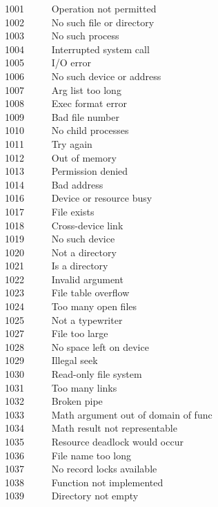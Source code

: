 1001 \ \ \ \ \ Operation not permitted\\
1002 \ \ \ \ \ No such file or directory\\
1003 \ \ \ \ \ No such process\\
1004 \ \ \ \ \ Interrupted system call\\
1005 \ \ \ \ \ I/O error\\
1006 \ \ \ \ \ No such device or address\\
1007 \ \ \ \ \ Arg list too long\\
1008 \ \ \ \ \ Exec format error\\
1009 \ \ \ \ \ Bad file number\\
1010 \ \ \ \ \ No child processes\\
1011 \ \ \ \ \ Try again\\
1012 \ \ \ \ \ Out of memory\\
1013 \ \ \ \ \ Permission denied\\
1014 \ \ \ \ \ Bad address\\
1016 \ \ \ \ \ Device or resource busy\\
1017 \ \ \ \ \ File exists\\
1018 \ \ \ \ \ Cross-device link\\
1019 \ \ \ \ \ No such device\\
1020 \ \ \ \ \ Not a directory\\
1021 \ \ \ \ \ Is a directory\\
1022 \ \ \ \ \ Invalid argument\\
1023 \ \ \ \ \ File table overflow\\
1024 \ \ \ \ \ Too many open files\\
1025 \ \ \ \ \ Not a typewriter\\
1027 \ \ \ \ \ File too large\\
1028 \ \ \ \ \ No space left on device\\
1029 \ \ \ \ \ Illegal seek\\
1030 \ \ \ \ \ Read-only file system\\
1031 \ \ \ \ \ Too many links\\
1032 \ \ \ \ \ Broken pipe\\
1033 \ \ \ \ \ Math argument out of domain of func\\
1034 \ \ \ \ \ Math result not representable\\
1035 \ \ \ \ \ Resource deadlock would occur\\
1036 \ \ \ \ \ File name too long\\
1037 \ \ \ \ \ No record locks available\\
1038 \ \ \ \ \ Function not implemented\\
1039 \ \ \ \ \ Directory not empty

